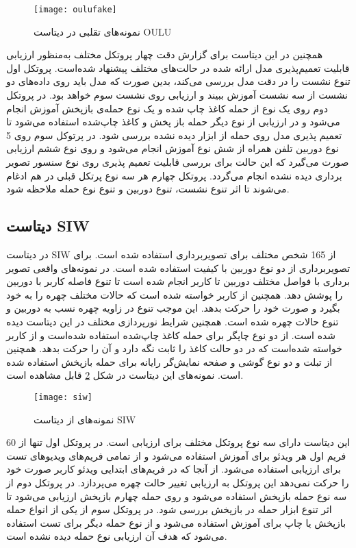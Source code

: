  
  \begin{figure}[h]
 	\centerline{\texttt{[image: oulufake]}}
 	\caption{نمونه‌های تقلبی در دیتاست OULU \cite{boulkenafet2017oulu} }
 	\label{fig:oulufake}
 \end{figure}
 
همچنین در این دیتاست برای گزارش دقت چهار پروتکل مختلف به‌منظور ارزیابی قابلیت تعمیم‌پذیری مدل ارائه شده در حالت‌های مختلف پیشنهاد شده‌است. پروتکل اول تنوع نشست را در دقت مدل بررسی می‌کند، بدین صورت که مدل باید روی داده‌های دو نشست از سه نشست آموزش ببیند و ارزیابی روی نشست سوم خواهد بود. در پروتکل دوم روی یک نوع از حمله کاغذ چاپ شده و یک نوع حمله‌ی بازپخش آموزش انجام می‌شود و در ارزیابی از نوع دیگر حمله باز پخش و کاغذ چاپ‌شده استفاده می‌شود تا تعمیم پذیری مدل روی حمله از ابزار دیده نشده بررسی شود. در پرتوکل سوم روی 5 نوع دوربین تلفن همراه از شش نوع آموزش انجام می‌شود و روی نوع ششم ارزیابی صورت می‌گیرد که این حالت برای بررسی قابلیت تعمیم پذیری روی نوع سنسور تصویر برداری دیده نشده انجام می‌گردد. پروتکل چهارم هر سه نوع پرتکل قبلی در هم ادغام می‌شوند تا اثر تنوع نشست، تنوع دوربین و تنوع نوع حمله ملاحظه شود.
\subsection{دیتاست SIW}
در دیتاست SIW
\cite{liu2018learning}
از 165 شخص مختلف برای تصویربرداری استفاده شده است. برای تصویربرداری از دو نوع دوربین با کیفیت استفاده شده است. در نمونه‌های واقعی تصویر برداری با فواصل مختلف دوربین تا کاربر انجام شده است تا تنوع فاصله کاربر با دوربین را پوشش دهد. همچنین از کاربر خواسته شده است که حالات مختلف چهره را به خود بگیرد و صورت خود را حرکت بدهد. این موجب تنوع در زاویه چهره نسب به دوربین و تنوع حالات چهره شده است. همچنین شرایط نورپردازی مختلف در این دیتاست دیده شده است. از دو نوع چاپگر برای حمله کاغذ چاپ‌شده استفاده شده‌است و از کاربر خواسته شده‌است که در دو حالت کاغذ را ثابت نگه دارد و آن را حرکت بدهد. همچنین از تبلت و دو نوع گوشی و صفحه نمایش‌گر رایانه برای حمله بازپخش استفاده شده است. نمونه‌های این دیتاست در  شکل 
\ref{fig:siw}
قابل مشاهده است. 
  \begin{figure}[h]
	\centerline{\texttt{[image: siw]}}
	\caption{نمونه‌های از دیتاست SIW \cite{liu2018learning} }
	\label{fig:siw}
\end{figure}

این دیتاست دارای سه نوع پروتکل مختلف برای ارزیابی است. در پروتکل اول تنها از 60 فریم اول هر ویدئو برای آموزش استفاده می‌شود و از تمامی فریم‌های ویدیوهای تست برای ارزیابی استفاده می‌شود. از آنجا که در فریم‌های ابتدایی ویدئو کاربر صورت خود را حرکت نمی‌دهد این پروتکل به ارزیابی تغییر حالت چهره می‌پردازد. در پروتکل دوم از سه نوع حمله بازپخش استفاده می‌شود و روی حمله چهارم بازپخش ارزیابی می‌شود تا اثر تنوع ابزار حمله در بازپخش بررسی شود. در پروتکل سوم از یکی از انواع حمله بازپخش یا چاپ برای آموزش استفاده می‌شود و از نوع حمله دیگر برای تست استفاده می‌شود که هدف آن ارزیابی نوع حمله دیده نشده است. 





 











 












